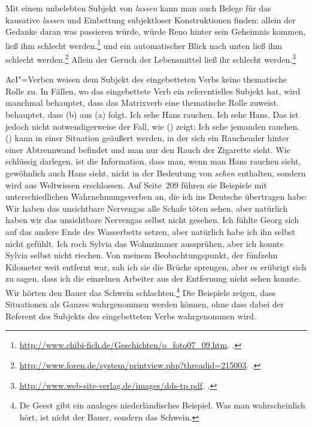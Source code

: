 Mit einem unbelebten Subjekt von \emph{lassen} kann man auch Belege für
das kausative \emph{lassen} und Einbettung subjektloser Konstruktionen finden:
\eal
\ex allein der Gedanke daran was passieren würde, würde Reno hinter sein Geheimnis kommen, ließ ihm schlecht werden.\footnote{%
\url{http://www.chibi-fich.de/Geschichten/o_foto07_09.htm}. .%
}
\ex und ein automatischer Blick nach unten ließ ihm schlecht werden.\footnote{
\url{http://www.foren.de/system/printview.php?threadid=215003}. .
}
\ex Allein der Geruch der Lebensmittel ließ ihr schlecht werden.\footnote{
\url{http://www.web-site-verlag.de/images/dds-tp.pdf}. .
}
\zl


\noindent
\label{page-start-aci-verbs-role}%
AcI"=Verben weisen dem Subjekt des eingebetteten Verbs keine thematische Rolle zu.
In Fällen, wo das eingebettete Verb ein referentielles Subjekt hat, wird manchmal
behauptet, dass das Matrixverb eine thematische Rolle zuweist.
\citet[]{Eisenberg94a} \zb behauptet, dass
(b) aus (a) folgt.
\eal
\ex{}
Ich sehe Hans rauchen.
\ex 
Ich sehe Hans.
\zl
Das ist jedoch nicht notwendigerweise der Fall, wie () zeigt:
\ea 
Ich sehe jemanden rauchen.
\z
() kann in einer Situation geäußert werden, in der sich ein Rauchender hinter einer Abtrennwand befindet
und man nur den Rauch der Zigarette sieht.
Wie \citet{KT76a} schlüssig darlegen, ist die Information, 
dass man, wenn man Hans rauchen sieht, gewöhnlich auch Hans sieht, 
nicht in der Bedeutung von \emph{sehen} enthalten, sondern wird
aus Weltwissen erschlossen.
Auf Seite~209 führen sie Beispiele mit unterschiedlichen Wahrnehmungsverben an, die ich
ins Deutsche übertragen habe:
\eal
\ex Wir haben das unsichtbare Nervengas alle Schafe töten sehen, aber natürlich haben
      wir das unsichtbare Nervengas selbst nicht gesehen.
%
\ex Ich fühlte Georg sich auf das andere Ende des Wasserbetts setzen, aber
      natürlich habe ich ihn selbst nicht gefühlt.
%
\ex Ich roch Sylvia das Wohnzimmer aussprühen, aber ich konnte Sylvia selbst nicht riechen.
%
\ex Von meinem Beobachtungspunkt, der fünfzehn Kilometer weit entfernt war,
      sah ich sie die Brücke sprengen, aber es erübrigt sich zu sagen, dass
      ich die einzelnen Arbeiter aus der Entfernung nicht sehen konnte.
\ex Wir hörten den Bauer das Schwein schlachten.\footnote{
        De Geest \citeyearpar[]{deGeest70a} gibt ein analoges niederländisches
        Beispiel. Was man wahrscheinlich hört, ist nicht der Bauer, sondern das Schwein.
      }
\zl
Die Beispiele zeigen, dass Situationen als Ganzes wahrgenommen werden können, ohne dass dabei
der Referent des Subjekts des eingebetteten Verbs wahrgenommen wird.%
\label{page-end-aci-verbs-role}%

